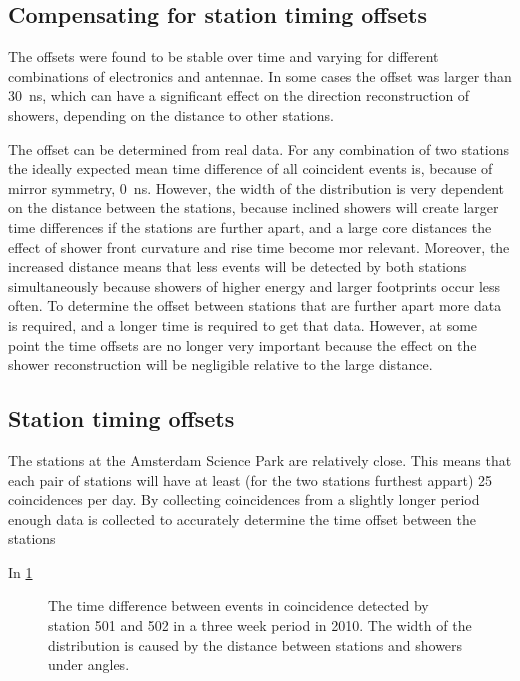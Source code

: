 \subsection{Compensating for station timing offsets}

The offsets were found to be stable over time and varying for different combinations of \hisparc electronics and \gps antennae. In some cases the offset was larger than \SI{30}{\ns}, which can have a significant effect on the direction reconstruction of showers, depending on the distance to other stations.

The offset can be determined from real data. For any combination of two stations the ideally expected mean time difference of all coincident events is, because of mirror symmetry, \SI{0}{\ns}. However, the width of the distribution is very dependent on the distance between the stations, because inclined showers will create larger time differences if the stations are further apart, and a large core distances the effect of shower front curvature and rise time become mor relevant. Moreover, the increased distance means that less events will be detected by both stations simultaneously because showers of higher energy and larger footprints occur less often. To determine the offset between stations that are further apart more data is required, and a longer time is required to get that data. However, at some point the time offsets are no longer very important because the effect on the shower reconstruction will be negligible relative to the large distance.


\subsection{Station timing offsets}

The \hisparc stations at the Amsterdam Science Park are relatively close. This means that each pair of stations will have at least (for the two stations furthest appart) 25 coincidences per day. By collecting coincidences from a slightly longer period enough data is collected to accurately determine the time offset between the stations


In \cref{fig:station_offsets_501_502}
\begin{figure}
    \centering
    
    \caption{ The
             time difference between events in coincidence detected by
             station 501 and 502 in a three week period in 2010. The
             width of the distribution is caused by the distance between
             stations and showers under angles.}
    \label{fig:station_offsets_501_502}
\end{figure}

